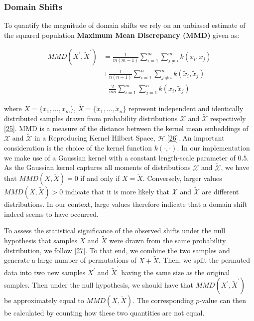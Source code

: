 \documentclass[conference,final,]{IEEEtran}
\theoremstyle{definition}
\theoremstyle{definition}
\theoremstyle{definition}
\theoremstyle{definition}
\theoremstyle{remark}
\begin{document}
\hypertarget{domain-shifts}{%
\subsubsection{Domain Shifts}\label{domain-shifts}}

To quantify the magnitude of domain shifts we rely on an unbiased estimate of the squared population \textbf{Maximum Mean Discrepancy (MMD)} given as:

\begin{equation}
\begin{aligned}
MMD({X}^\prime,\tilde{X}^\prime) &= \frac{1}{m(m-1)}\sum_{i=1}^m\sum_{j\neq i}^m k(x_i,x_j) \\ &+ \frac{1}{n(n-1)}\sum_{i=1}^n\sum_{j\neq i}^n k(\tilde{x}_i,\tilde{x}_j) \\ &- \frac{2}{mn}\sum_{i=1}^m\sum_{j=1}^n k(x_i,\tilde{x}_j) \label{eq:mmd}
\end{aligned}
\end{equation}

where \(X=\{x_1,...,x_m\}\), \(\tilde{X}=\{\tilde{x}_1,...,\tilde{x}_n\}\) represent independent and identically distributed samples drawn from probability distributions \(\mathcal{X}\) and \(\mathcal{\tilde{X}}\) respectively \protect\hyperlink{ref-gretton2012kernel}{{[}25{]}}. MMD is a measure of the distance between the kernel mean embeddings of \(\mathcal{X}\) and \(\mathcal{\tilde{X}}\) in a Reproducing Kernel Hilbert Space, \(\mathcal{H}\) \protect\hyperlink{ref-berlinet2011reproducing}{{[}26{]}}. An important consideration is the choice of the kernel function \(k(\cdot,\cdot)\). In our implementation we make use of a Gaussian kernel with a constant length-scale parameter of \(0.5\). As the Gaussian kernel captures all moments of distributions \(\mathcal{X}\) and \(\mathcal{\tilde{X}}\), we have that \(MMD(X,\tilde{X})=0\) if and only if \(X=\tilde{X}\). Conversely, larger values \(MMD(X,\tilde{X})>0\) indicate that it is more likely that \(\mathcal{X}\) and \(\mathcal{\tilde{X}}\) are different distributions. In our context, large values therefore indicate that a domain shift indeed seems to have occurred.

To assess the statistical significance of the observed shifts under the null hypothesis that samples \(X\) and \(\tilde{X}\) were drawn from the same probability distribution, we follow \protect\hyperlink{ref-arcones1992bootstrap}{{[}27{]}}. To that end, we combine the two samples and generate a large number of permutations of \(X + \tilde{X}\). Then, we split the permuted data into two new samples \(X^\prime\) and \(\tilde{X}^\prime\) having the same size as the original samples. Then under the null hypothesis, we should have that \(MMD(X^\prime,\tilde{X}^\prime)\) be approximately equal to \(MMD(X,\tilde{X})\). The corresponding \(p\)-value can then be calculated by counting how these two quantities are not equal.
\end{document}
